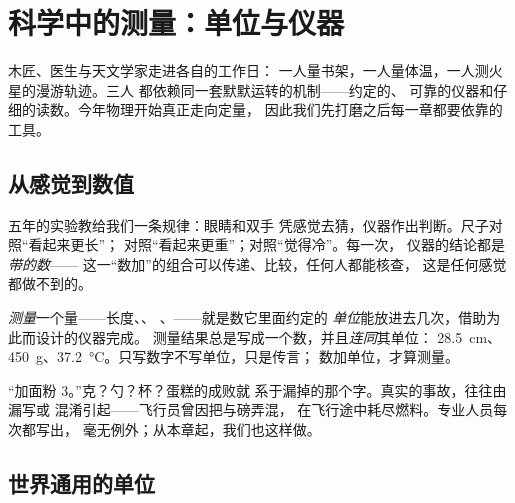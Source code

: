 \chapter{科学中的测量：单位与仪器}\label{ch:g6:measurement-in-science}

木匠、医生与天文学家走进各自的工作日：
一人量书架，一人量体温，一人测火星的漫游轨迹。三人
都依赖同一套默默运转的机制——约定的、
可靠的仪器和仔细的读数。今年物理开始真正走向定量，
因此我们先打磨之后每一章都要依靠的
工具。

\section{从感觉到数值}

五年的实验教给我们一条规律：眼睛和双手
凭感觉去猜，仪器作出判断。尺子对照“看起来更长”；
对照“看起来更重”；对照“觉得冷”。每一次，
仪器的结论都是\emph{带的数}——
这一“数加”的组合可以传递、比较，任何人都能核查，
这是任何感觉都做不到的。

\begin{definition}[测量一个量]\label{def:g6:measurement-in-science:measuring}
\emph{测量}一个量——长度、、
、——就是数它里面约定的
\emph{单位}能放进去几次，借助为此而设计的仪器完成。
测量结果总是写成一个数，并且\emph{连同}其单位：
\qty{28.5}{cm}、\qty{450}{g}、\qty{37.2}{\celsius}。只写数字不写单位，只是传言；
数加单位，才算测量。
\end{definition}

\begin{example}[漏写单位的代价]\label{ex:g6:measurement-in-science:missing}
“加面粉 3。”克？勺？杯？蛋糕的成败就
系于漏掉的那个字。真实的事故，往往由漏写或
混淆引起——飞行员曾因把与磅弄混，
在飞行途中耗尽燃料。专业人员每次都写出，
毫无例外；从本章起，我们也这样做。
\end{example}

\section{世界通用的单位}

